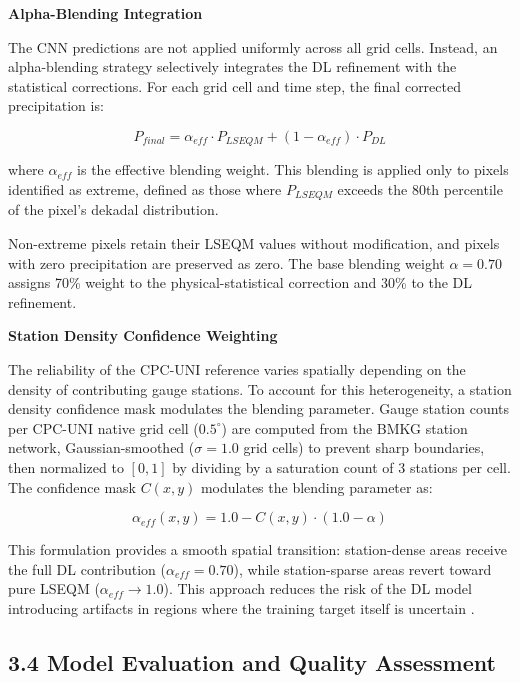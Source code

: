 \documentclass[
]{article}
\begin{document}
\textbf{Alpha-Blending Integration}

The CNN predictions are not applied uniformly across all grid cells.
Instead, an alpha-blending strategy selectively integrates the DL
refinement with the statistical corrections. For each grid cell and time
step, the final corrected precipitation is:

\[P_{final} = \alpha_{eff} \cdot P_{LSEQM} + (1 - \alpha_{eff}) \cdot P_{DL}\]

where \(\alpha_{eff}\) is the effective blending weight. This blending
is applied only to pixels identified as extreme, defined as those where
\(P_{LSEQM}\) exceeds the 80th percentile of the pixel's dekadal
distribution.

Non-extreme pixels retain their LSEQM values without modification, and
pixels with zero precipitation are preserved as zero. The base blending
weight \(\alpha = 0.70\) assigns 70\% weight to the physical-statistical
correction and 30\% to the DL refinement.

\textbf{Station Density Confidence Weighting}

The reliability of the CPC-UNI reference varies spatially depending on
the density of contributing gauge stations. To account for this
heterogeneity, a station density confidence mask modulates the blending
parameter. Gauge station counts per CPC-UNI native grid cell
(\(0.5^{\circ}\)) are computed from the BMKG station network,
Gaussian-smoothed (\(\sigma = 1.0\) grid cells) to prevent sharp
boundaries, then normalized to \([0, 1]\) by dividing by a saturation
count of 3 stations per cell. The confidence mask \(C(x, y)\) modulates
the blending parameter as:

\[\alpha_{eff}(x, y) = 1.0 - C(x, y) \cdot (1.0 - \alpha)\]

This formulation provides a smooth spatial transition: station-dense
areas receive the full DL contribution (\(\alpha_{eff} = 0.70\)), while
station-sparse areas revert toward pure LSEQM
(\(\alpha_{eff} \rightarrow 1.0\)). This approach reduces the risk of
the DL model introducing artifacts in regions where the training target
itself is uncertain \cite{ref27}.

\subsection{3.4 Model Evaluation and Quality
Assessment}\label{model-evaluation-and-quality-assessment}
\end{document}
